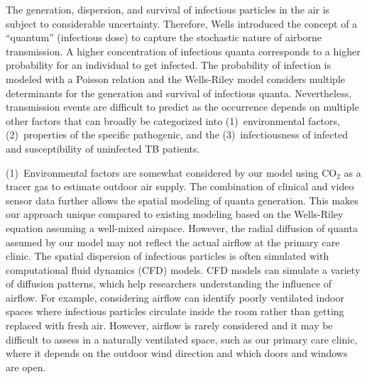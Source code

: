 \documentclass[fleqn,11pt]{wlscirep}
\begin{document}


The generation, dispersion, and survival of infectious particles in the air is subject to considerable uncertainty. Therefore, Wells\cite{Wells1955} introduced the concept of a ``quantum'' (infectious dose) to capture the stochastic nature of airborne transmission. A higher concentration of infectious quanta corresponds to a higher probability for an individual to get infected. The probability of infection is modeled with a Poisson relation and the Wells-Riley model considers multiple determinants for the generation and survival of infectious quanta. Nevertheless, transmission events are difficult to predict as the occurrence depends on multiple other factors that can broadly be categorized into (1)~environmental factors, (2)~properties of the specific pathogenic, and the (3)~infectiousness of infected and susceptibility of uninfected TB patients. 

(1)~Environmental factors are somewhat considered by our model using CO$_2$ as a tracer gas to estimate outdoor air supply. The combination of clinical and video sensor data further allows the spatial modeling of quanta generation. This makes our approach unique compared to existing modeling based on the Wells-Riley equation assuming a well-mixed airspace\cite{Riley1978AJE,Rudnick2003IndoorAir}. However, the radial diffusion of quanta assumed by our model may not reflect the actual airflow at the primary care clinic. The spatial dispersion of infectious particles is often simulated with computational fluid dynamics (CFD) models\cite{Vuorinen2020SafSci,Jung2021InfectChemo,Li2021BuildEnv}. CFD models can simulate a variety of diffusion patterns, which help researchers understanding the influence of airflow. For example, considering airflow can identify poorly ventilated indoor spaces where infectious particles circulate inside the room rather than getting replaced with fresh air\cite{Li2021BuildEnv}. However, airflow is rarely considered and it may be difficult to assess in a naturally ventilated space, such as our primary care clinic, where it depends on the outdoor wind direction and which doors and windows are open. 
\end{document}
